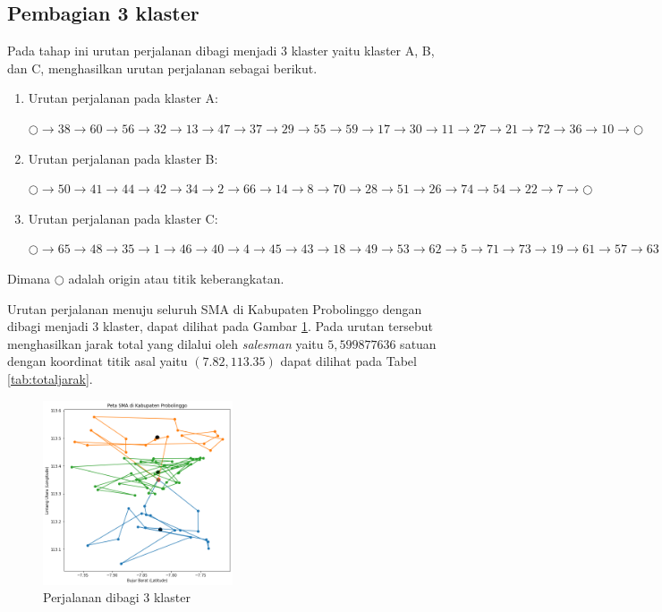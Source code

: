 \subsection{Pembagian 3 klaster}

Pada tahap ini urutan perjalanan dibagi menjadi 3 klaster yaitu klaster A, B, dan C, menghasilkan urutan perjalanan sebagai berikut.

\begin{enumerate}
\item Urutan perjalanan pada klaster A:

$\bigcirc \to 38 \to 60 \to 56 \to 32 \to 13 \to 47 \to 37 \to 29 \to 55 \to 59 \to 17 \to 30 \to 11 \to 27 \to 21 \to 72 \to 36 \to 10 \to \bigcirc$

\item Urutan perjalanan pada klaster B:

$\bigcirc \to 50 \to 41 \to 44 \to 42 \to 34 \to 2 \to 66 \to 14 \to 8 \to 70 \to 28 \to 51 \to 26 \to 74 \to 54 \to 22 \to 7 \to \bigcirc$

\item Urutan perjalanan pada klaster C:

$\bigcirc \to 65 \to 48 \to 35 \to 1 \to 46 \to 40 \to 4 \to 45 \to 43 \to 18 \to 49 \to 53 \to 62 \to 5 \to 71 \to 73 \to 19 \to 61 \to 57 \to 63 \to 15 \to 25 \to 68 \to 58 \to 24 \to 31 \to 16 \to 3 \to 12 \to 20 \to 52 \to 67 \to 69 \to 75 \to 39 \to 6 \to 64 \to 23 \to 33 \to 9 \to \bigcirc$

\end{enumerate}

\noindent Dimana $\bigcirc$ adalah origin atau titik keberangkatan.

Urutan perjalanan menuju seluruh SMA di Kabupaten Probolinggo dengan dibagi menjadi 3 klaster, dapat dilihat pada Gambar \ref{fig:hasil_mtsp3}. Pada urutan tersebut menghasilkan jarak total yang dilalui oleh \textit{salesman} yaitu $5,599877636$ satuan dengan koordinat titik asal yaitu $(7.82, 113.35)$ dapat dilihat pada Tabel \ref{tab:totaljarak}.

\begin{figure}[H]
\centering
\includegraphics[width=0.5\textwidth]{Gambar/hasil_mtsp/3}
\caption{Perjalanan dibagi 3 klaster}
\label{fig:hasil_mtsp3}
\end{figure}

